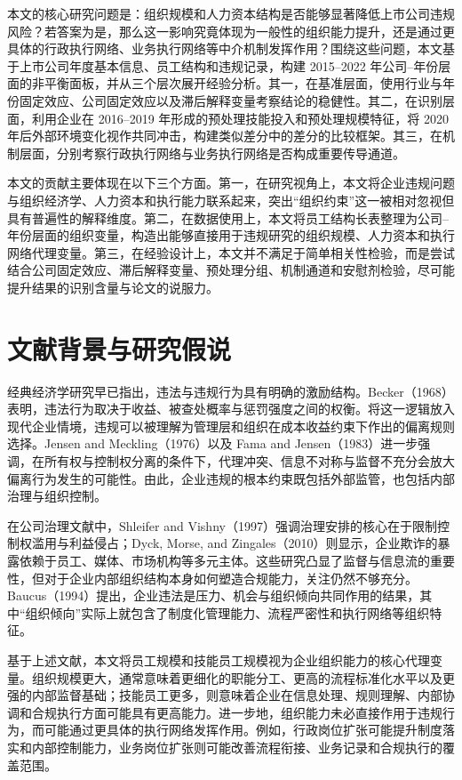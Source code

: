 \documentclass[12pt]{ctexart}
\begin{document}
本文的核心研究问题是：组织规模和人力资本结构是否能够显著降低上市公司违规风险？若答案为是，那么这一影响究竟体现为一般性的组织能力提升，还是通过更具体的行政执行网络、业务执行网络等中介机制发挥作用？围绕这些问题，本文基于上市公司年度基本信息、员工结构和违规记录，构建 2015--2022 年公司--年份层面的非平衡面板，并从三个层次展开经验分析。其一，在基准层面，使用行业与年份固定效应、公司固定效应以及滞后解释变量考察结论的稳健性。其二，在识别层面，利用企业在 2016--2019 年形成的预处理技能投入和预处理规模特征，将 2020 年后外部环境变化视作共同冲击，构建类似差分中的差分的比较框架。其三，在机制层面，分别考察行政执行网络与业务执行网络是否构成重要传导通道。

本文的贡献主要体现在以下三个方面。第一，在研究视角上，本文将企业违规问题与组织经济学、人力资本和执行能力联系起来，突出“组织约束”这一被相对忽视但具有普遍性的解释维度。第二，在数据使用上，本文将员工结构长表整理为公司--年份层面的组织变量，构造出能够直接用于违规研究的组织规模、人力资本和执行网络代理变量。第三，在经验设计上，本文并不满足于简单相关性检验，而是尝试结合公司固定效应、滞后解释变量、预处理分组、机制通道和安慰剂检验，尽可能提升结果的识别含量与论文的说服力。

\section{文献背景与研究假说}
经典经济学研究早已指出，违法与违规行为具有明确的激励结构。Becker（1968）表明，违法行为取决于收益、被查处概率与惩罚强度之间的权衡。将这一逻辑放入现代企业情境，违规可以被理解为管理层和组织在成本收益约束下作出的偏离规则选择。Jensen and Meckling（1976）以及 Fama and Jensen（1983）进一步强调，在所有权与控制权分离的条件下，代理冲突、信息不对称与监督不充分会放大偏离行为发生的可能性。由此，企业违规的根本约束既包括外部监管，也包括内部治理与组织控制。

在公司治理文献中，Shleifer and Vishny（1997）强调治理安排的核心在于限制控制权滥用与利益侵占；Dyck, Morse, and Zingales（2010）则显示，企业欺诈的暴露依赖于员工、媒体、市场机构等多元主体。这些研究凸显了监督与信息流的重要性，但对于企业内部组织结构本身如何塑造合规能力，关注仍然不够充分。Baucus（1994）提出，企业违法是压力、机会与组织倾向共同作用的结果，其中“组织倾向”实际上就包含了制度化管理能力、流程严密性和执行网络等组织特征。

基于上述文献，本文将员工规模和技能员工规模视为企业组织能力的核心代理变量。组织规模更大，通常意味着更细化的职能分工、更高的流程标准化水平以及更强的内部监督基础；技能员工更多，则意味着企业在信息处理、规则理解、内部协调和合规执行方面可能具有更高能力。进一步地，组织能力未必直接作用于违规行为，而可能通过更具体的执行网络发挥作用。例如，行政岗位扩张可能提升制度落实和内部控制能力，业务岗位扩张则可能改善流程衔接、业务记录和合规执行的覆盖范围。
\end{document}
